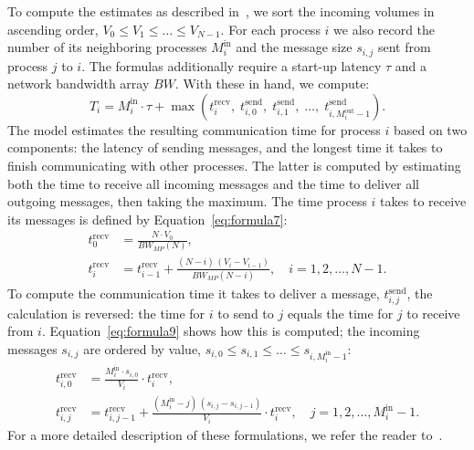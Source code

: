 To compute the estimates as described in~\cite{Xing_of_Heterogeneous}, we sort the incoming volumes in ascending order, $V_0 \leq V_1 \leq \dots \leq V_{N-1}$. For each process $i$ we also record the number of its neighboring processes $M^{\mathrm{in}}_i$ and the message size $s_{i,j}$ sent from process $j$ to $i$. The formulas additionally require a start-up latency $\tau$ and a network bandwidth array $BW$. With these in hand, we compute:
\begin{equation}\label{eq:formula8}
	T_i = M^{\mathrm{in}}_i \cdot \tau + \max\left(t^{\mathrm{recv}}_{i},\; t^{\mathrm{send}}_{i,0},\; t^{\mathrm{send}}_{i,1},\; \dots,\; t^{\mathrm{send}}_{i,M^{\mathrm{out}}_i-1}\right).
\end{equation}
The model estimates the resulting communication time for process $i$ based on two components: the latency of sending messages, and the longest time it takes to finish communicating with other processes. The latter is computed by estimating both the time to receive all incoming messages and the time to deliver all outgoing messages, then taking the maximum. The time process $i$ takes to receive its messages is defined by Equation~\ref{eq:formula7}:
\begin{equation}\label{eq:formula7}
	\begin{aligned}
		t_0^{\mathrm{recv}} &= \frac{N \cdot V_0}{BW_{MP}(N)}, \\
		t_i^{\mathrm{recv}} &= t_{i-1}^{\mathrm{recv}} + \frac{(N - i)\,(V_i - V_{i-1})}{BW_{MP}(N - i)}, \quad i = 1, 2, \dots, N-1.
	\end{aligned}
\end{equation}
To compute the communication time it takes to deliver a message, $t^{\mathrm{send}}_{i,j}$, the calculation is reversed: the time for $i$ to send to $j$ equals the time for $j$ to receive from $i$. Equation~\ref{eq:formula9} shows how this is computed; the incoming messages $s_{i,j}$ are ordered by value, $s_{i,0} \leq s_{i,1} \leq \dots \leq s_{i,M^{\mathrm{in}}_i - 1}$:
\begin{equation}\label{eq:formula9}
	\begin{aligned}
		t_{i,0}^{\mathrm{recv}} &= \frac{M^{\mathrm{in}}_i \cdot s_{i,0}}{V_i} \cdot t_i^{\mathrm{recv}},\\
		t_{i,j}^{\mathrm{recv}} &= t_{i,j-1}^{\mathrm{recv}} + \frac{(M^{\mathrm{in}}_i - j)\,(s_{i,j} - s_{i,j-1})}{V_i} \cdot t_i^{\mathrm{recv}}, \quad j = 1, 2, \dots, M^{\mathrm{in}}_i-1.
	\end{aligned}
\end{equation}
For a more detailed description of these formulations, we refer the reader to~\cite{Xing_of_Heterogeneous}.

